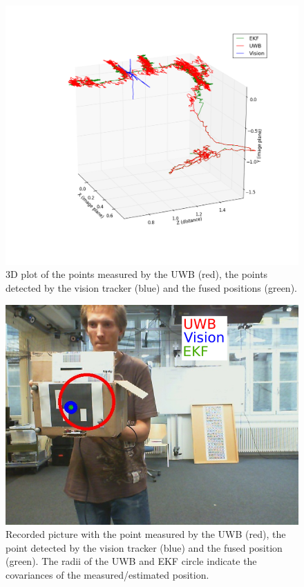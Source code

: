 \begin{figure}[ht!]\centering
	\includegraphics[width=1.0\textwidth]{figures/state_track}
	\caption{3D plot of the points measured by the \ac{UWB} (red), the points detected by the vision tracker (blue) and the fused positions (green).}\label{fig:statetrack}
\end{figure}

\begin{figure}[ht!]\centering
	\includegraphics[width=1.0\textwidth]{figures/2d_output}
	\caption{Recorded picture with the point measured by the \ac{UWB} (red), the point detected by the vision tracker (blue) and the fused position (green). The radii of the \ac{UWB} and \ac{EKF} circle indicate the covariances of the measured/estimated position.}\label{fig:statetrack2d}
\end{figure}